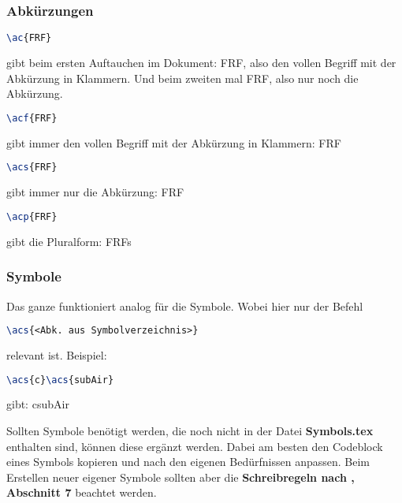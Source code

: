 \subsubsection{Abkürzungen}
\label{sec:Beispiele_SymboleAbk_Abk}
%
\begin{lstlisting}[language=tex]
\ac{FRF}
\end{lstlisting}
gibt beim ersten Auftauchen im Dokument: \ac{FRF}, also den vollen Begriff mit der Abkürzung in Klammern.
Und beim zweiten mal \ac{FRF}, also nur noch die Abkürzung.\\
%
\begin{lstlisting}[language=tex]
\acf{FRF}
\end{lstlisting}
gibt immer den vollen Begriff mit der Abkürzung in Klammern: \acf{FRF}\\
%
\begin{lstlisting}[language=tex]
\acs{FRF}
\end{lstlisting}
gibt immer nur die Abkürzung: \acs{FRF}\\
%
\begin{lstlisting}[language=tex]
\acp{FRF}
\end{lstlisting}
gibt die Pluralform: \acp{FRF} 
%
%
\subsubsection{Symbole}
\label{sec:Beispiele_SymboleAbk_Symbole}
%
Das ganze funktioniert analog für die Symbole.
Wobei hier nur der Befehl
%
\begin{lstlisting}[language=tex]
\acs{<Abk. aus Symbolverzeichnis>}
\end{lstlisting}
relevant ist.
Beispiel:
\begin{lstlisting}[language=tex]
\acs{c}\acs{subAir}
\end{lstlisting}
gibt: \acs{c}\acs{subAir}
\par
Sollten Symbole benötigt werden, die noch nicht in der Datei \textbf{Symbols.tex} enthalten sind, können diese ergänzt werden.
Dabei am besten den Codeblock eines Symbols kopieren und nach den eigenen Bedürfnissen anpassen.
Beim Erstellen neuer eigener Symbole sollten aber die \textbf{Schreibregeln nach \citeauthor{DINENISO800001:201308}, Abschnitt 7} beachtet werden.
%
%
%
